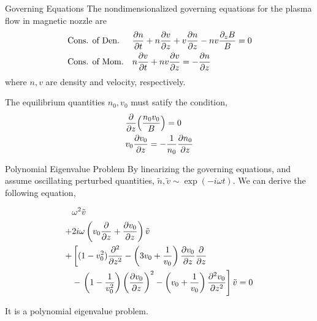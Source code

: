 \begin{frame}{Governing Equations}
  The nondimensionalized governing equations for the plasma flow in magnetic nozzle are 
  \begin{align}
    & \text{Cons. of Den.}  &&\pdv{n}{t} + n\pdv{v}{z} + v\pdv{n}{z} - nv\frac{\partial_z B}{B} = 0 \\
    & \text{Cons. of Mom.}  &&n\pdv{v}{t} + nv\pdv{v}{z} = -\pdv{n}{z}
  \end{align}
  where $n,v$ are density and velocity, respectively. 

  The equilibrium quantities $n_0, v_0$ must satify the condition, 
  \begin{align}
      &\pdv{z}(\frac{n_0v_0}{B}) = 0 \label{eq:equilibrium-convervation-of-mass}\\
      &v_0\pdv{v_0}{z} = -\frac{1}{n_0}\pdv{n_0}{z} \label{eq:equilibrium-convervation-of-momentum}
  \end{align}
\end{frame}
 
\begin{frame}{Polynomial Eigenvalue Problem}
  By linearizing the governing equations, and assume oscillating perturbed quantities, $\tilde{n}, \tilde{v} \sim \exp(-i\omega t)$. We can derive the following equation,

  \begin{equation}
    \begin{aligned}
      &\omega^2 \tilde{v} \\ 
      +& 2i\omega\left(v_0\pdv{}{z} + \pdv{v_0}{z}\right) \tilde{v} \\
      +& \left[ (1-v_0^2)\pdv[2]{}{z} 
        -\left(3v_0 + \frac{1}{v_0}\right)\pdv{v_0}{z}\pdv{}{z} \right. \\
        &- \left. \left(1-\frac{1}{v_0^2}\right)\left(\pdv{v_0}{z}\right)^2 
      - \left(v_0+\frac{1}{v_0}\right)\pdv[2]{v_0}{z} \right]\tilde{v}
      = 0
    \end{aligned}
    \label{eq:polynomial_eigenvalue_problem}
  \end{equation}

  It is a polynomial eigenvalue problem.
\end{frame}
